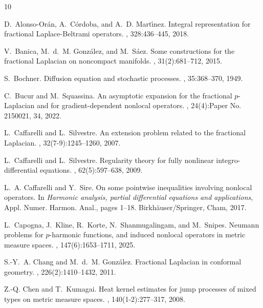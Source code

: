 \documentclass[11pt]{amsart}
\theoremstyle{plain}
\theoremstyle{definition}
\numberwithin{equation}{section}
\begin{document}
\begin{thebibliography}{10}

D.~Alonso-Or\'{a}n, A.~C\'{o}rdoba, and A.~D. Mart\'{\i}nez.
\newblock Integral representation for fractional {L}aplace-{B}eltrami
  operators.
, 328:436--445, 2018.

V.~Banica, M.~d.~M. Gonz\'{a}lez, and M.~S\'{a}ez.
\newblock Some constructions for the fractional {L}aplacian on noncompact
  manifolds.
, 31(2):681--712, 2015.

S.~Bochner.
\newblock Diffusion equation and stochastic processes.
, 35:368--370, 1949.

C.~Bucur and M.~Squassina.
\newblock An asymptotic expansion for the fractional {$p$}-{L}aplacian and for
  gradient-dependent nonlocal operators.
, 24(4):Paper No. 2150021, 34, 2022.

L.~Caffarelli and L.~Silvestre.
\newblock An extension problem related to the fractional {L}aplacian.
, 32(7-9):1245--1260, 2007.

L.~Caffarelli and L.~Silvestre.
\newblock Regularity theory for fully nonlinear integro-differential equations.
, 62(5):597--638, 2009.

L.~A. Caffarelli and Y.~Sire.
\newblock On some pointwise inequalities involving nonlocal operators.
\newblock In {\em Harmonic analysis, partial differential equations and
  applications}, Appl. Numer. Harmon. Anal., pages 1--18.
  Birkh\"{a}user/Springer, Cham, 2017.

L.~Capogna, J.~Kline, R.~Korte, N.~Shanmugalingam, and M.~Snipes.
\newblock Neumann problems for $p$-harmonic functions, and induced nonlocal
  operators in metric measure spaces.
, 147(6):1653--1711, 2025.

S.-Y.~A. Chang and M.~d.~M. Gonz\'{a}lez.
\newblock Fractional {L}aplacian in conformal geometry.
, 226(2):1410--1432, 2011.

Z.-Q. Chen and T.~Kumagai.
\newblock Heat kernel estimates for jump processes of mixed types on metric
  measure spaces.
, 140(1-2):277--317, 2008.


\end{thebibliography}
\end{document}
